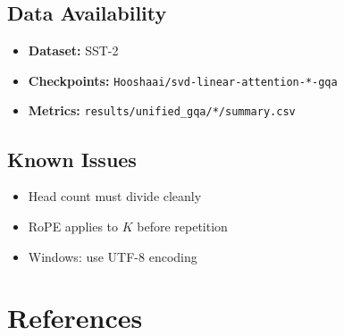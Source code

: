 \subsection{Data Availability}

\begin{itemize}
\item \textbf{Dataset:} SST-2
\item \textbf{Checkpoints:} \texttt{Hooshaai/svd-linear-attention-*-gqa}
\item \textbf{Metrics:} \texttt{results/unified\_gqa/*/summary.csv}

\end{itemize}
\subsection{Known Issues}

\begin{itemize}
\item Head count must divide cleanly
\item RoPE applies to $K$ before repetition
\item Windows: use UTF-8 encoding
\end{itemize}


\section{References}

